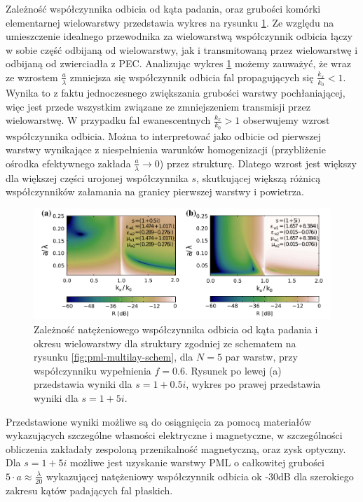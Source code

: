 Zależność współczynnika odbicia od kąta padania, oraz grubości komórki elementarnej wielowarstwy przedstawia wykres na rysunku \ref{fig:oqe3}. Ze względu na umieszczenie idealnego przewodnika za wielowarstwą współczynnik odbicia łączy w sobie część odbijaną od wielowarstwy, jak i transmitowaną przez wielowarstwę i odbijaną od zwierciadła z PEC. Analizując wykres \ref{fig:oqe3} możemy zauważyć, że wraz ze wzrostem $\frac{a}{\lambda}$ zmniejsza się współczynnik odbicia fal propagujących się $\frac{k_x}{k_0}<1$. Wynika to z faktu jednoczesnego zwiększania grubości warstwy pochłaniającej, więc jest przede wszystkim związane ze zmniejszeniem transmisji przez wielowarstwę. W przypadku fal ewanescentnych $\frac{k_x}{k_0}>1$ obserwujemy wzrost współczynnika odbicia. Można to interpretować jako odbicie od pierwszej warstwy wynikające z niespełnienia warunków homogenizacji (przybliżenie ośrodka efektywnego zakłada $\frac{a}{\lambda} \to 0$) przez strukturę. Dlatego wzrost jest większy dla większej części urojonej współczynnika $s$, skutkującej większą różnicą współczynników załamania na granicy pierwszej warstwy i powietrza.

\begin{figure}[tb]
	\includegraphics[width=\textwidth]{images/pml/fig3.png}
	\caption{Zależność natężeniowego współczynnika odbicia od kąta padania i okresu wielowarstwy dla struktury zgodniej ze schematem na rysunku \ref{fig:pml-multilay-schem}, dla $N=5$ par warstw, przy współczynniku wypełnienia $f=0.6$. Rysunek po lewej (a) przedstawia wyniki dla $s=1+0.5i$, wykres po prawej przedstawia wyniki dla $s=1+5i$.}
	\label{fig:oqe3}
\end{figure}

Przedstawione wyniki możliwe są do osiągnięcia za pomocą materiałów wykazujących szczególne własności elektryczne i magnetyczne, w szczególności obliczenia zakładały zespoloną przenikalność magnetyczną, oraz zysk optyczny. Dla $s=1+5i$ możliwe jest uzyskanie warstwy PML o całkowitej grubości $5\cdot a \approx \frac{\lambda}{20}$ wykazującej natężeniowy współczynnik odbicia ok -30dB dla szerokiego zakresu kątów padających fal płaskich.

